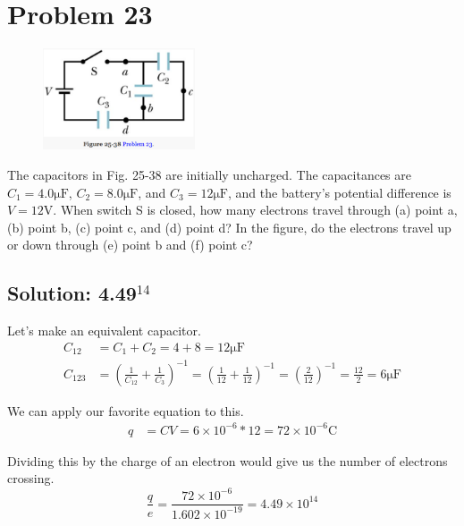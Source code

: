 \documentclass[12pt]{article}
\begin{document}
\pagebreak
\section{Problem 23}
\begin{figure}
    \vspace{-30pt}
    \includegraphics[width=0.4\textwidth]{picture_6.png} 
\end{figure}
The capacitors in Fig. 25-38 are initially uncharged. 
The capacitances are $C_1 = 4.0 \unit{\micro\farad}$, $C_2 = 8.0 \unit{\micro\farad}$, and $C_3 = 12 \unit{\micro\farad}$, and the battery's potential difference is $V = 12 \unit{\volt}$. 
When switch S is closed, how many electrons travel through (a) point a, (b) point b, (c) point c, and (d) point d? 
In the figure, do the electrons travel up or down through (e) point b and (f) point c?

\subsection{Solution: 4.49$^{14}$}
Let's make an equivalent capacitor. 
\begin{align*}
    C_{12}  &=  C_1 + C_2 = 4 + 8 = 12 \unit{\micro\farad}\\
    C_{123} &=  \left( \frac{1}{C_{12}} + \frac{1}{C_3} \right)^{-1}
        =   \left( \frac{1}{12} + \frac{1}{12} \right)^{-1}
        =   \left( \frac{2}{12} \right)^{-1}
        =   \frac{12}{2}
        =   6\unit{\micro\farad}
\end{align*}

We can apply our favorite equation to this.
\begin{align*}
    q   &=  CV
        =   6 \times 10^{-6} * 12
        =   72 \times 10^{-6} \unit{\coulomb}
\end{align*}

Dividing this by the charge of an electron would give us the number of electrons crossing. 
\begin{equation}
    \frac{q}{e} = \frac{72 \times 10^{-6}}{1.602 \times 10^{-19}}
        =   \boxed{4.49 \times 10^{14}}
\end{equation}
\end{document}
